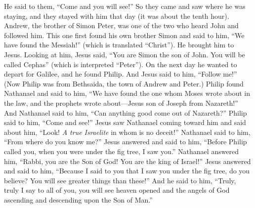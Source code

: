 \begin{biblechapter}
\verse He said to them, “Come and you will see!” So they came and saw where he was staying, and they stayed with him that day (it was about the tenth hour).
 Andrew, the brother of Simon Peter, was one of the two who heard John and followed him.
\verse This one first found his own brother Simon and said to him, “We have found the Messiah!” (which is translated “Christ”).
\verse He brought him to Jesus. Looking at him, Jesus said, “You are Simon the son of John. You will be called Cephas” (which is interpreted “Peter”).
 On the next day he wanted to depart for Galilee, and he found Philip. And Jesus said to him, “Follow me!”
\verse (Now Philip was from Bethsaida, the town of Andrew and Peter.)
\verse Philip found Nathanael and said to him, “We have found the one whom Moses wrote about in the law, and the prophets wrote about—Jesus son of Joseph from Nazareth!”
\verse And Nathanael said to him, “Can anything good come out of Nazareth?” Philip said to him, “Come and see!”
\verse Jesus saw Nathanael coming toward him and said about him, “Look! \textit{A true Israelite} in whom is no deceit!”
\verse Nathanael said to him, “From where do you know me?” Jesus answered and said to him, “Before Philip called you, when you were under the fig tree, I saw you.”
\verse Nathanael answered him, “Rabbi, you are the Son of God! You are the king of Israel!”
\verse Jesus answered and said to him, “Because I said to you that I saw you under the fig tree, do you believe? You will see greater things than these!”
\verse And he said to him, “Truly, truly I say to all of you, you will see heaven opened and the angels of God ascending and descending upon the Son of Man.”
\end{biblechapter}

